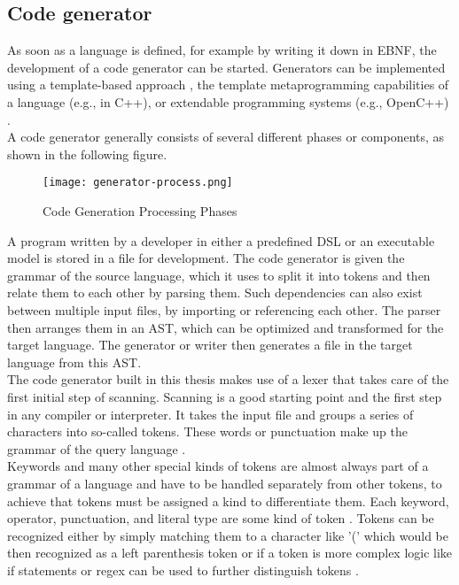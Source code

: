 \subsection{Code generator}
As soon as a language is defined, for example by writing it down in \ac{EBNF}, the development of a code generator can be started. Generators can be implemented using a template-based approach \parencite[see][]{cleaveland_program_2001}, the template metaprogramming capabilities of a language (e.g., in C++), or extendable programming systems (e.g., OpenC++) \parencite[cf.][p. 16]{czarnecki_generative_2000}.\\
A code generator generally consists of several different phases or components, as shown in the following figure.
\begin{figure}[H]
    \caption{Code Generation Processing Phases}
    \label{fig:generator-process}
    \texttt{[image: generator-process.png]}
    \\
    \cite[Source: Based on][p. 5]{sarkar_code_2001}
\end{figure}
A program written by a developer in either a predefined \ac{DSL} or an executable model is stored in a file for development. The code generator is given the grammar of the source language, which it uses to split it into tokens and then relate them to each other by parsing them. Such dependencies can also exist between multiple input files, by importing or referencing each other. The parser then arranges them in an \ac{AST}, which can be optimized and transformed for the target language. The generator or writer then generates a file in the target language from this \ac{AST}.\\
The code generator built in this thesis makes use of a lexer that takes care of the first initial step of scanning. Scanning is a good starting point and the first step in any compiler or interpreter. It takes the input file and groups a series of characters into so-called tokens. These words or punctuation make up the grammar of the query language \parencite[cf.][p. 39]{nystrom_crafting_2021}.\\
Keywords and many other special kinds of tokens are almost always part of a grammar of a language and have to be handled separately from other tokens, to achieve that tokens must be assigned a kind to differentiate them. Each keyword, operator, punctuation, and literal type are some kind of token \parencite[cf.][p. 43]{nystrom_crafting_2021}. Tokens can be recognized either by simply matching them to a character like '(' which would be then recognized as a left parenthesis token or if a token is more complex logic like if statements or regex can be used to further distinguish tokens \parencite[see][pp. 47-54]{nystrom_crafting_2021}.\\
